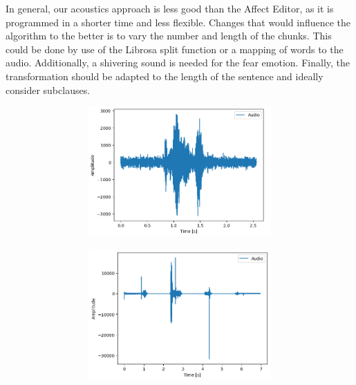\documentclass[11pt]{article}
\begin{document}
In general, our acoustics approach is less good than the Affect Editor, as it is programmed in a shorter time and less flexible. Changes that would influence the algorithm to the better is to vary the number and length of the chunks. This could be done by use of the Librosa split function or a mapping of words to the audio. Additionally, a shivering sound is needed for the fear emotion. Finally, the transformation should be adapted to the length of the sentence and ideally consider subclauses.


\begin{figure}
\begin{subfigure}{.5\textwidth}
\begin{subfigure}{.18\textwidth}
  \centering
  \includegraphics[width=\linewidth]{"Bilder/seminat_neutral.png"}
  \label{fig:sfig1}
\end{subfigure}%
\begin{subfigure}{.18\textwidth}
  \centering
  \includegraphics[width=\linewidth]{Bilder/seminat_angry.png}

\end{subfigure}
\end{subfigure}
\end{figure}
\end{document}
